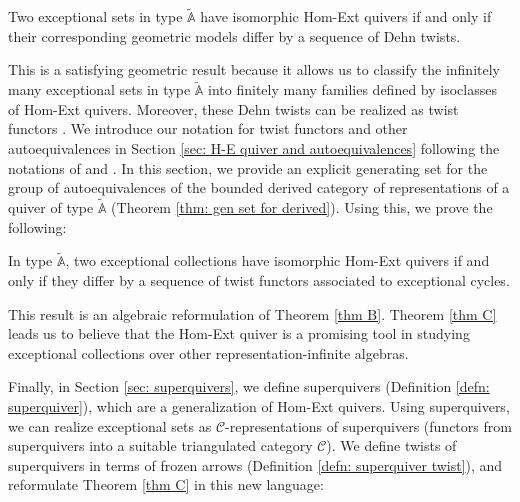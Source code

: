 \documentclass[12pt]{amsart}
\theoremstyle{plain}
\newenvironment{customthm}[1]
    {\renewcommand
    \theinnercustomthm{#1}\innercustomthm}{\endinnercustomthm}
\theoremstyle{definition}
\theoremstyle{remark}
\begin{document}
\begin{customthm}{B}[Theorem \ref{thm: iso H-E quiver iff Dehn twist}]\label{thm B}
Two exceptional sets in type $\tilde{\mathbb{A}}$ have {\color{black} isomorphic} Hom-Ext quivers if and only if their corresponding geometric models differ by a sequence of Dehn twists.
\end{customthm}

This is a satisfying geometric result because it allows us to classify the infinitely many exceptional sets in type $\tilde{\mathbb{A}}$ into finitely many families defined by isoclasses of Hom-Ext quivers. Moreover, these Dehn twists can be realized as twist functors \cite{opper2019auto}. We introduce our notation for twist functors and other autoequivalences in Section \ref{sec: H-E quiver and autoequivalences} following the notations of \cite{broomhead2017discrete} and \cite{opper2019auto}. In this section, we provide an explicit generating set for the group of autoequivalences of the bounded derived category of representations of a quiver of type $\tilde{\mathbb{A}}$ (Theorem \ref{thm: gen set for derived}). Using this, we prove the following:

\begin{customthm}{C}[Corollary \ref{cor: iso HE quivers iff derived equiv}] \label{thm C}
In type $\tilde{\mathbb{A}}$, two exceptional collections have {\color{black} isomorphic} Hom-Ext quivers if and only if they differ by {\color{black} a sequence of twist functors associated to exceptional cycles.}
\end{customthm}

This result is an algebraic reformulation of Theorem \ref{thm B}. Theorem \ref{thm C} leads us to believe that the Hom-Ext quiver is a promising tool in studying exceptional collections over other representation-infinite algebras.

Finally, in Section \ref{sec: superquivers}, we define superquivers (Definition \ref{defn: superquiver}), which are a generalization of Hom-Ext quivers. Using superquivers, we can realize exceptional sets as $\mathcal{C}$-representations of superquivers (functors from superquivers into a suitable triangulated category $\mathcal{C}$). We define twists of superquivers in terms of frozen arrows (Definition \ref{defn: superquiver twist}), and reformulate Theorem \ref{thm C} in this new language:
\end{document}
